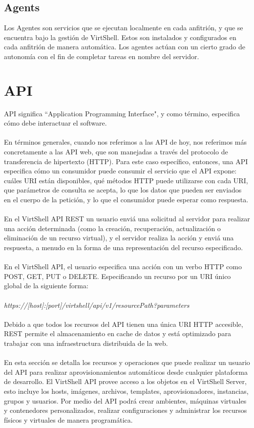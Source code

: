 \documentclass[conference, spanish]{IEEEtran}
\begin{document}
\subsection{Agents}
Los Agentes son servicios que se ejecutan localmente en cada anfitrión, y que se encuentra bajo la gestión de VirtShell. Estos son instalados y configurados en cada anfitrión de manera automática. Los agentes actúan con un cierto grado de autonomía con el fin de completar tareas en nombre del servidor.\\

\section{API}
API significa ``Application Programming Interface", y como término, especifica cómo debe interactuar el software.\\
\\
En términos generales, cuando nos referimos a las API de hoy, nos referimos más concretamente a las API web, que son manejadas a través del protocolo de transferencia de hipertexto (HTTP). Para este caso específico, entonces, una API especifica cómo un consumidor puede consumir el servicio que el API expone: cuáles URI están disponibles, qué métodos HTTP puede utilizarse con cada URI, que parámetros de consulta se acepta, lo que los datos que pueden ser enviados en el cuerpo de la petición, y lo que el consumidor puede esperar como respuesta.\\
\\
En el VirtShell API REST un usuario enviá una solicitud al servidor para realizar una acción determinada (como la creación, recuperación, actualización o eliminación de un recurso virtual), y el servidor realiza la acción y enviá una respuesta, a menudo en la forma de una representación del recurso especificado.\\
\\
En el VirtShell API, el usuario especifica una acción con un verbo HTTP como POST, GET, PUT o DELETE. Especificando un recurso por un URI único global de la siguiente forma: \\
\\
\emph{https://[host]:[port]/virtshell/api/v1/resourcePath?parameters}\\
\\
Debido a que todos los recursos del API tienen una única URI HTTP accesible, REST permite el almacenamiento en cache de datos y está optimizado para trabajar con una infraestructura distribuida de la web.\\
\\
En esta sección se detalla los recursos y operaciones que puede realizar un usuario del API para realizar aprovisionamientos automáticos desde cualquier plataforma de desarrollo. El VirtShell API provee acceso a los objetos en el VirtShell Server, esto incluye los hosts, imágenes, archivos, templates, aprovisionadores, instancias, grupos y usuarios. Por medio del API podrá crear ambientes, máquinas virtuales y contenedores personalizados, realizar configuraciones y administrar los recursos físicos y virtuales de manera programática. \\
\end{document}
